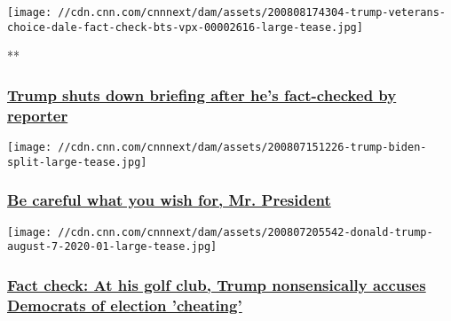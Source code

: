 \href{/videos/politics/2020/08/08/trump-veterans-choice-dale-fact-check-bts-vpx.cnn}{}

\texttt{[image: //cdn.cnn.com/cnnnext/dam/assets/200808174304-trump-veterans-choice-dale-fact-check-bts-vpx-00002616-large-tease.jpg]}

**

\hypertarget{trump-shuts-down-briefing-after-hes-fact-checked-by-reporter}{%
\subsubsection{\texorpdfstring{\href{/videos/politics/2020/08/08/trump-veterans-choice-dale-fact-check-bts-vpx.cnn}{Trump
shuts down briefing after he's fact-checked by
reporter}}{Trump shuts down briefing after he's fact-checked by reporter}}\label{trump-shuts-down-briefing-after-hes-fact-checked-by-reporter}}

\href{/2020/08/08/opinions/trump-fourth-debate-request-zelizer/index.html}{}

\texttt{[image: //cdn.cnn.com/cnnnext/dam/assets/200807151226-trump-biden-split-large-tease.jpg]}

\hypertarget{be-careful-what-you-wish-for-mr-president}{%
\subsubsection{\texorpdfstring{\href{/2020/08/08/opinions/trump-fourth-debate-request-zelizer/index.html}{Be
careful what you wish for, Mr.
President}}{Be careful what you wish for, Mr. President}}\label{be-careful-what-you-wish-for-mr-president}}

\href{/2020/08/07/politics/donald-trump-press-briefing-democrats-cheating-election-fact-check/index.html}{}

\texttt{[image: //cdn.cnn.com/cnnnext/dam/assets/200807205542-donald-trump-august-7-2020-01-large-tease.jpg]}

\hypertarget{fact-check-at-his-golf-club-trump-nonsensically-accuses-democrats-of-election-cheating-}{%
\subsubsection{\texorpdfstring{\href{/2020/08/07/politics/donald-trump-press-briefing-democrats-cheating-election-fact-check/index.html}{Fact
check: At his golf club, Trump nonsensically accuses Democrats of
election 'cheating'
}}{Fact check: At his golf club, Trump nonsensically accuses Democrats of election 'cheating' }}\label{fact-check-at-his-golf-club-trump-nonsensically-accuses-democrats-of-election-cheating-}}

